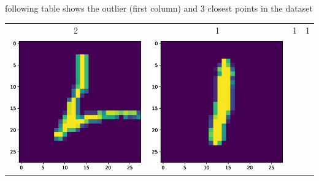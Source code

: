 \documentclass{article}
\begin{document}
following table shows the outlier (first column) and 3 closest points in the dataset


\begin{tabular}{cccc}

2 &1& 1& 1\\

\includegraphics[scale=.1]{fig/MNIST_207_2_0_207_2.eps}&
\includegraphics[scale=.1]{fig/MNIST_207_2_1_942_1.eps}&

\end{tabular}
\end{document}
